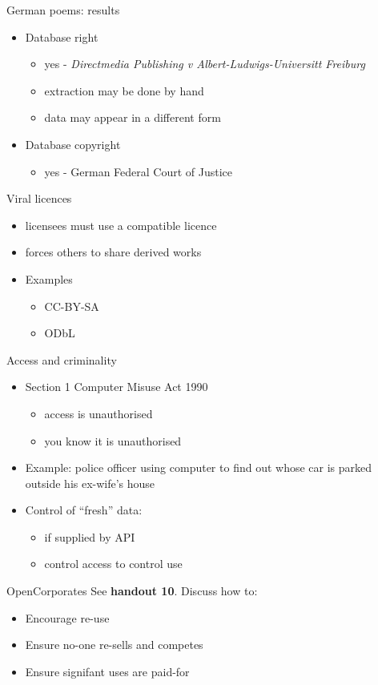 \documentclass[aspectratio=169,14pt]{beamer}
\begin{document}
  \begin{frame}{German poems: results}
    \begin{itemize}
    \item Database right
      \begin{itemize}
      \item yes - \protect\textit{Directmedia Publishing v Albert-Ludwigs-Universitt Freiburg}
      \item extraction may be done by hand
      \item data may appear in a different form
      \end{itemize}
    \item Database copyright
      \begin{itemize}
      \item yes - German Federal Court of Justice
      \end{itemize}
    \end{itemize}
  \end{frame}

  \begin{frame}{Viral licences}
    \begin{itemize}
    \item licensees must use a compatible licence
    \item forces others to share derived works
    \item Examples
      \begin{itemize}
      \item CC-BY-SA
      \item ODbL
      \end{itemize}
    \end{itemize}
  \end{frame}

  \begin{frame}{Access and criminality}
    \begin{itemize}
    \item Section 1 Computer Misuse Act 1990
      \begin{itemize}
      \item access is unauthorised
      \item you know it is unauthorised
      \end{itemize}
    \item Example: police officer using computer to find out whose car is parked outside his ex-wife's house
    \item Control of ``fresh'' data:
      \begin{itemize}
      \item if supplied by API
      \item control access to control use
      \end{itemize}
    \end{itemize}
  \end{frame}

  \begin{frame}{OpenCorporates}
See {\protect\textbf{handout 10}.} Discuss how to:
    \begin{itemize}
    \item Encourage re-use
    \item Ensure no-one re-sells and competes
    \item Ensure signifant uses are paid-for
    \end{itemize}
    
  \end{frame}
\end{document}
